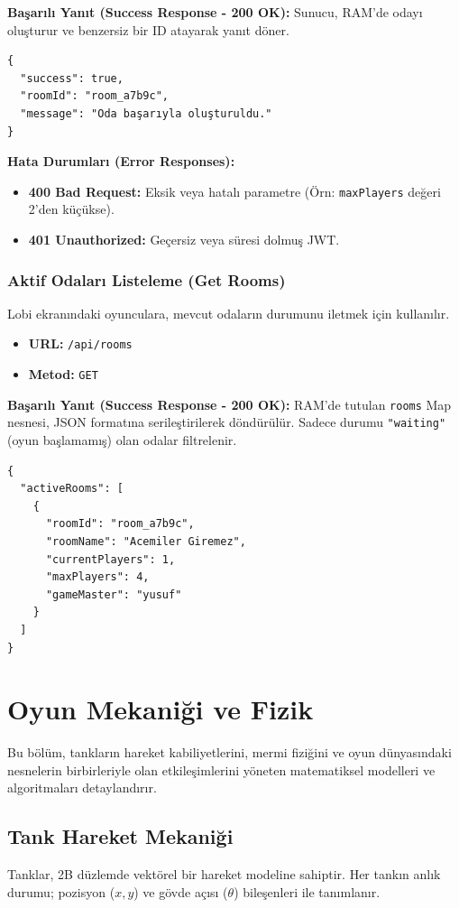 \documentclass[12pt,a4paper]{article}
\begin{document}
\textbf{Başarılı Yanıt (Success Response - 200 OK):}
Sunucu, RAM'de odayı oluşturur ve benzersiz bir ID atayarak yanıt döner.
\begin{verbatim}
{
  "success": true,
  "roomId": "room_a7b9c",
  "message": "Oda başarıyla oluşturuldu."
}
\end{verbatim}

\textbf{Hata Durumları (Error Responses):}
\begin{itemize}
      \item \textbf{400 Bad Request:} Eksik veya hatalı parametre (Örn: \texttt{maxPlayers} değeri 2'den küçükse).
      \item \textbf{401 Unauthorized:} Geçersiz veya süresi dolmuş JWT.
\end{itemize}

\subsubsection{Aktif Odaları Listeleme (Get Rooms)}
Lobi ekranındaki oyunculara, mevcut odaların durumunu iletmek için kullanılır.

\begin{itemize}
      \item \textbf{URL:} \texttt{/api/rooms}
      \item \textbf{Metod:} \texttt{GET}
\end{itemize}

\textbf{Başarılı Yanıt (Success Response - 200 OK):}
RAM'de tutulan \texttt{rooms} Map nesnesi, JSON formatına serileştirilerek döndürülür. Sadece durumu \texttt{"waiting"} (oyun başlamamış) olan odalar filtrelenir.
\begin{verbatim}
{
  "activeRooms": [
    {
      "roomId": "room_a7b9c",
      "roomName": "Acemiler Giremez",
      "currentPlayers": 1,
      "maxPlayers": 4,
      "gameMaster": "yusuf"
    }
  ]
}
\end{verbatim}

\section{Oyun Mekaniği ve Fizik}
Bu bölüm, tankların hareket kabiliyetlerini, mermi fiziğini ve oyun dünyasındaki nesnelerin birbirleriyle olan etkileşimlerini yöneten matematiksel modelleri ve algoritmaları detaylandırır.

\subsection{Tank Hareket Mekaniği}
Tanklar, 2B düzlemde vektörel bir hareket modeline sahiptir. Her tankın anlık durumu; pozisyon ($x, y$) ve gövde açısı ($\theta$) bileşenleri ile tanımlanır.
\end{document}

